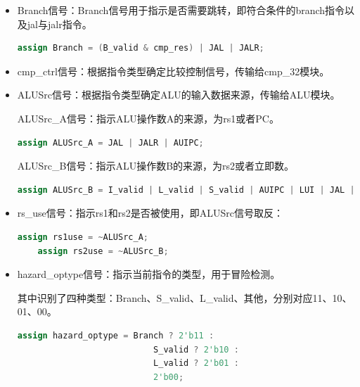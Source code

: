 \documentclass{article}
\begin{document}
\begin{itemize}
    \item Branch信号：Branch信号用于指示是否需要跳转，即符合条件的branch指令以及jal与jalr指令。\par
\begin{lstlisting}[language=Verilog]
    assign Branch = (B_valid & cmp_res) | JAL | JALR;
\end{lstlisting}
    \item cmp\_ctrl信号：根据指令类型确定比较控制信号，传输给cmp\_32模块。\par
    \item ALUSrc信号：根据指令类型确定ALU的输入数据来源，传输给ALU模块。\par
     ALUSrc\_A信号：指示ALU操作数A的来源，为rs1或者PC。\par
\begin{lstlisting}[language=Verilog]
        assign ALUSrc_A = JAL | JALR | AUIPC;
\end{lstlisting}
     ALUSrc\_B信号：指示ALU操作数B的来源，为rs2或者立即数。\par
\begin{lstlisting}[language=Verilog]
        assign ALUSrc_B = I_valid | L_valid | S_valid | AUIPC | LUI | JAL | JALR;
\end{lstlisting}
    \item rs\_use信号：指示rs1和rs2是否被使用，即ALUSrc信号取反：\par
\begin{lstlisting}[language=Verilog]
    assign rs1use = ~ALUSrc_A;
    assign rs2use = ~ALUSrc_B;  
\end{lstlisting} 
    \item hazard\_optype信号：指示当前指令的类型，用于冒险检测。\par
    其中识别了四种类型：Branch、S\_valid、L\_valid、其他，分别对应11、10、01、00。
\begin{lstlisting}[language=Verilog]
    assign hazard_optype = Branch ? 2'b11 :
                           S_valid ? 2'b10 :
                           L_valid ? 2'b01 :
                           2'b00; 
\end{lstlisting}
\end{itemize}
\end{document}
